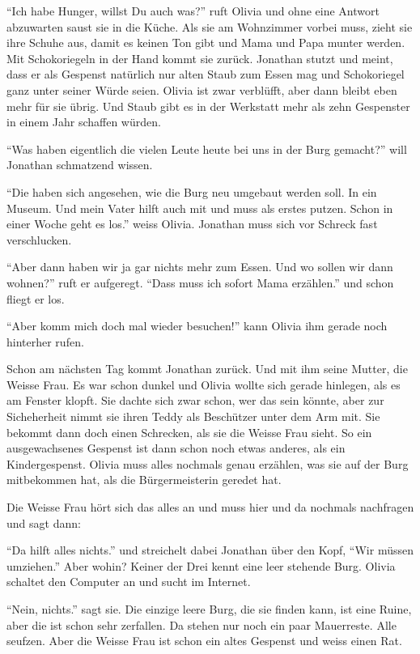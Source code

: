 \enquote{Ich habe Hunger, willst Du auch was?} ruft Olivia und ohne eine Antwort abzuwarten saust sie in die Küche. Als sie am Wohnzimmer vorbei muss, zieht sie ihre Schuhe aus, damit es keinen Ton gibt und Mama und Papa munter werden. Mit Schokoriegeln in der Hand kommt sie zurück. Jonathan stutzt und meint, dass er als Gespenst natürlich nur alten Staub zum Essen mag und Schokoriegel ganz unter seiner Würde seien. Olivia ist zwar verblüfft, aber dann bleibt eben mehr für sie übrig. Und Staub gibt es in der Werkstatt mehr als zehn Gespenster in einem Jahr schaffen würden.

\enquote{Was haben eigentlich die vielen Leute heute bei uns in der Burg gemacht?} will Jonathan schmatzend wissen.

\enquote{Die haben sich angesehen, wie die Burg neu umgebaut werden soll. In ein Museum. Und mein Vater hilft auch mit und muss als erstes putzen. Schon in einer Woche geht es los.} weiss Olivia. Jonathan muss sich vor Schreck fast verschlucken.

\enquote{Aber dann haben wir ja gar nichts mehr zum Essen. Und wo sollen wir dann wohnen?} ruft er aufgeregt. \enquote{Dass muss ich sofort Mama erzählen.} und schon fliegt er los.

\enquote{Aber komm mich doch mal wieder besuchen!} kann Olivia ihm gerade noch hinterher rufen.

Schon am nächsten Tag kommt Jonathan zurück. Und mit ihm seine Mutter, die Weisse Frau. Es war schon dunkel und Olivia wollte sich gerade hinlegen, als es am Fenster klopft. Sie dachte sich zwar schon, wer das sein könnte, aber zur Sicheherheit nimmt sie ihren Teddy als Beschützer unter dem Arm mit. Sie bekommt dann doch einen Schrecken, als sie die Weisse Frau sieht. So ein ausgewachsenes Gespenst ist dann schon noch etwas anderes, als ein Kindergespenst. Olivia muss alles nochmals genau erzählen, was sie auf der Burg mitbekommen hat, als die Bürgermeisterin geredet hat.

Die Weisse Frau hört sich das alles an und muss hier und da nochmals nachfragen und sagt dann: 

\enquote{Da hilft alles nichts.} und streichelt dabei Jonathan über den Kopf, \enquote{Wir müssen umziehen.} Aber wohin? Keiner der Drei kennt eine leer stehende Burg. Olivia schaltet den Computer an und sucht im Internet.

\enquote{Nein, nichts.} sagt sie. Die einzige leere Burg, die sie finden kann, ist eine Ruine, aber die ist schon sehr zerfallen. Da stehen nur noch ein paar Mauerreste. Alle seufzen. Aber die Weisse Frau ist schon ein altes Gespenst und weiss einen Rat.

